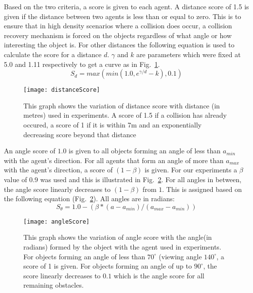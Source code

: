 Based on the two criteria, a score is given to each agent. A distance score of 1.5 is given if the distance between two agents is less than or equal to zero. This is to ensure that in high density scenarios where a collision does occur, a collision recovery mechanism is forced on the objects regardless of what angle or how interesting the object is. For other distances the following equation is used to calculate the score for a distance $d$. $\gamma$ and $k$ are parameters which were fixed at 5.0 and 1.11 respectively to get a curve as in Fig.~\ref{fig:DistanceScore}.
\begin{equation}
  	S_d = max(min(1.0, e^{\gamma / d} - k),0.1)
\end{equation}

\begin{figure}[!t]
\centering
\texttt{[image: distanceScore]}
\caption[Distance Score]{This graph shows the variation of distance score with distance (in metres) used in experiments. A score of 1.5 if a collision has already occured, a score of 1 if it is within 7m and an exponentially decreasing score beyond that distance}
\label{fig:DistanceScore}
\end{figure}

An angle score of $1.0$ is given to all objects forming an angle of less than $a_{min}$ with the agent's direction. For all agents that form an angle of more than $a_{max} $ with the agent's direction,  a score of $ (1-\beta) $ is given. For our experiments a $\beta$ value of 0.9 was used and this is illustrated in Fig.~\ref{fig:AngleScore}. For all angles in between, the angle score linearly decreases to $ (1-\beta) $ from $1$. This is assigned based on the following equation (Fig.~\ref{fig:AngleScore}). All angles are in radians:
\begin{equation}
	S_{\theta} = 1.0 - (\beta * (a - a_{min} ) / (a_{max}-a_{min}))
\end{equation}

\begin{figure}[!t]
\centering
\texttt{[image: angleScore]}
\caption[Angle Score]{This graph shows the variation of angle score with the angle(in radians) formed by the object with the agent used in experiments. For objects forming an angle of less than $70^{\circ}$ (viewing angle $140^{\circ}$, a score of 1 is given. For objects forming an angle of up to $90^{\circ}$, the score linearly decreases to $0.1$ which is the angle score for all remaining obstacles.}
\label{fig:AngleScore}
\end{figure}

